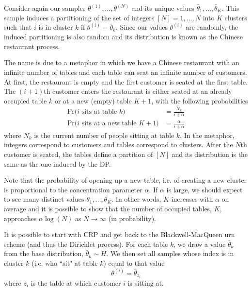 \documentclass[final,3p,times,twocolumn]{elsarticle}
\begin{document}
Consider again our samples $\theta^{(1)},\dots,\theta^{(N)}$ and its unique values $\bar \theta_1,\dots,\bar \theta_K$.
This sample induces a partitioning of the set of integers $[N] = {1,\dots,N}$ into $K$ clusters such that $i$ is in cluster $k$ if $\theta^{(i)} = \bar \theta_k$.
Since our values $\theta^{(i)}$ are randomly, the induced partitioning is also random and its distribution is known as the Chinese restaurant process.

The name is due to a metaphor in which we have a Chinese restaurant with an infinite number of tables and each table can seat an infinite number of customers.
At first, the restaurant is empty and the first customer is seated at the first table. 
The $(i+1)$th customer enters the restaurant is either seated at an already occupied table $k$ or at a new (empty) table $K+1$, with the following probabilities
\begin{equation}
\label{eqn:crp}
\begin{split}
\mbox{Pr($i$ sits at table $k$)} &= \frac{N_k}{i+\alpha}\\
\mbox{Pr($i$ sits at a new table $K+1$)} &= \frac{\alpha}{i+\alpha}
\end{split}
\end{equation}
where $N_k$ is the current number of people sitting at table $k$.
In the metaphor, integers correspond to customers and tables correspond to clusters. 
After the $N$th customer is seated, the tables define a partition of $[N]$ and its distribution is the same as the one induced by the DP.

Note that the probability of opening up a new table, i.e. of creating a new cluster is proportional to the concentration parameter $\alpha$.
If $\alpha$ is large, we should expect to see many distinct values $\bar \theta_1,\dots,\bar \theta_K$.
In other words, $K$ increases with $\alpha$ on average and it is possible to show that the number of occupied tables, $K$, approaches $\alpha \log(N)$ as $N \rightarrow \infty$ (in probability).

It is possible to start with CRP and get back to the Blackwell-MacQueen urn scheme (and thus the Dirichlet process). 
For each table $k$, we draw a value $\bar \theta_k$ from the base distribution, $\bar \theta_k \sim H$.
We then set all samples whose index is in cluster $k$ (i.e. who ``sit" at table $k$) equal to that value
\begin{equation}
\theta^{(i)} = \bar \theta_{z_i}
\end{equation}
where $z_i$ is the table at which customer $i$ is sitting at.
\end{document}
